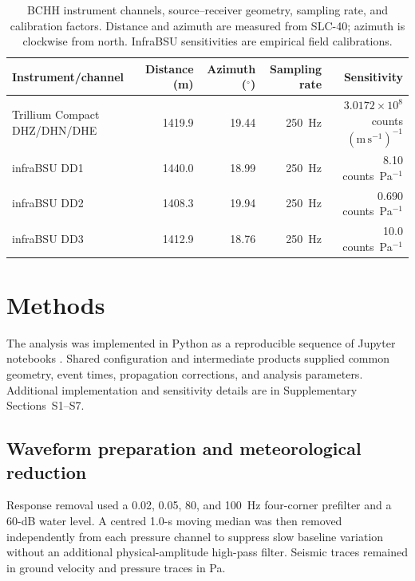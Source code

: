 \documentclass[]{seismica}
\begin{document}
\begin{table}[!tbp]
\centering
\caption{BCHH instrument channels, source--receiver geometry, sampling rate,
and calibration factors. Distance and azimuth are measured from SLC-40;
azimuth is clockwise from north. InfraBSU sensitivities are empirical field
calibrations.}
\label{tab:instrument_calibration}
\begin{tabular}{lrrrr}
\hline
Instrument/channel & Distance (m) & Azimuth ($^\circ$) & Sampling rate & Sensitivity \\
\hline
Trillium Compact DHZ/DHN/DHE & 1419.9 & 19.44 & 250~Hz
  & $3.0172\times10^8$ counts $(\mathrm{m\,s^{-1}})^{-1}$ \\
infraBSU DD1 & 1440.0 & 18.99 & 250~Hz & 8.10 counts~Pa$^{-1}$ \\
infraBSU DD2 & 1408.3 & 19.94 & 250~Hz & 0.690 counts~Pa$^{-1}$ \\
infraBSU DD3 & 1412.9 & 18.76 & 250~Hz & 10.0 counts~Pa$^{-1}$ \\
\hline
\end{tabular}
\end{table}
\FloatBarrier

\section{Methods}
\label{sec:methods}

The analysis was implemented in Python as a reproducible sequence of Jupyter
notebooks \citep{kluyver2016jupyter}. Shared configuration and intermediate
products supplied common geometry, event times, propagation corrections, and
analysis parameters. Additional implementation and sensitivity details are in
Supplementary Sections~S1--S7.

\subsection{Waveform preparation and meteorological reduction}

Response removal used a 0.02, 0.05, 80, and 100~Hz four-corner prefilter and a
60-dB water level. A centred 1.0-s moving median was then removed independently
from each pressure channel to suppress slow baseline variation without an
additional physical-amplitude high-pass filter. Seismic traces remained in
ground velocity and pressure traces in Pa.
\end{document}
